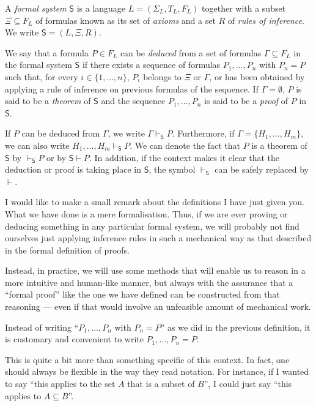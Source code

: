 \begin{definition}
A \emph{formal system} $\mathsf{S}$ is a language $L = (\Sigma_L, T_L, F_L)$ together with a subset $\Xi\subseteq F_L$ of formulas known as its set of \emph{axioms} and a set $R$ of \emph{rules of inference}.
We write $\mathsf{S} = (L,\Xi,R)$.

We say that a formula $P \in F_L$ can be \emph{deduced} from a set of formulas $\Gamma\subseteq F_L$ in the formal system $\mathsf{S}$ if there exists a sequence of formulas $P_1,\ldots,P_n$ with $P_n = P$ such that, for every $i\in \{1,\ldots,n\}$, $P_i$ belongs to $\Xi$ or $\Gamma$, or has been obtained by applying a rule of inference on previous formulas of the sequence. If $\Gamma = \emptyset$, $P$ is said to be a \emph{theorem} of $\mathsf{S}$ and the sequence $P_1,\ldots,P_n$ is said to be a \emph{proof} of $P$ in $\mathsf{S}$.

If $P$ can be deduced from $\Gamma$, we write $\Gamma \vdash_{\mathsf{S}} P$. Furthermore, if $\Gamma = \{H_1,\ldots,H_m\}$, we can also write $H_1,\ldots,H_m\vdash_{\mathsf{S}} P$. We can denote the fact that $P$ is a theorem of $\mathsf{S}$ by $\vdash_{\mathsf{S}} P$ or by $\mathsf{S}\vdash P$. In addition, if the context makes it clear that the deduction or proof is taking place in $\mathsf{S}$, the symbol $\vdash_{\mathsf{S}}$ can be safely replaced by $\vdash$.
\end{definition}

\begin{para}
I would like to make a small remark about the definitions I have just given you.
What we have done is a mere formalisation.
Thus, if we are ever proving or deducing something in any particular formal system, we will probably not find ourselves just applying inference rules in such a mechanical way as that described in the formal definition of proofs.

Instead, in practice, we will use some methods that will enable us to reason in a more intuitive and human-like manner, but always with the assurance that a ``formal proof'' like the one we have defined can be constructed from that reasoning --- even if that would involve an unfeasible amount of mechanical work.
\end{para}

\begin{para}[Notation]
Instead of writing ``$P_1,\ldots,P_n$ with $P_n = P$'' as we did in the previous definition, it is customary and convenient to write $P_1,\ldots,P_n = P$.

This is quite a bit more than something specific of this context. In fact, one should always be flexible in the way they read notation. For instance, if I wanted to say ``this applies to the set $A$ that is a subset of $B$'', I could just say ``this applies to $A\subseteq B$''.
\end{para}

